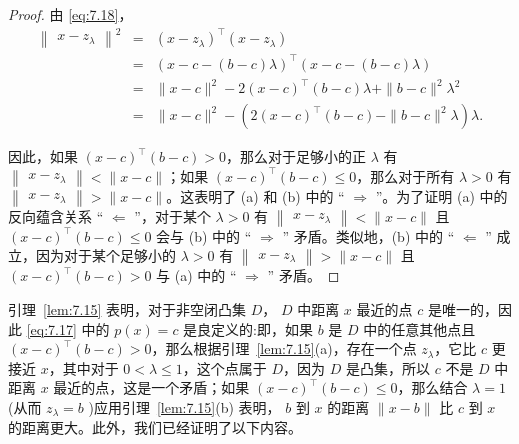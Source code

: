 \begin{proof}
由 \eqref{eq:7.18}，
\begin{eqnarray*}
{\begin{Vmatrix}x - {z}_{\lambda }\end{Vmatrix}}^{2} &=& {\left( x - {z}_{\lambda }\right) }^{\top }\left( {x - {z}_{\lambda }}\right)\\
&=& {\left( x - c - \left( b - c\right) \lambda \right) }^{\top }\left( {x - c - \left( {b - c}\right) \lambda }\right)\\
&=& \parallel x - c{\parallel }^{2} - 2{\left( x - c\right) }^{\top }\left( {b - c}\right) \lambda  + \parallel b - c{\parallel }^{2}{\lambda }^{2}
\\
&=& \parallel x - c{\parallel }^{2} - \left( {2{\left( x - c\right) }^{\top }\left( {b - c}\right)  - \parallel b - c{\parallel }^{2}\lambda }\right) \lambda .
\end{eqnarray*}

因此，如果 \({\left( x - c\right) }^{\top }\left( {b - c}\right)  > 0\)，那么对于足够小的正 \(\lambda\) 有 \(\begin{Vmatrix}{x - {z}_{\lambda }}\end{Vmatrix} < \parallel x - c\parallel\)；如果 \({\left( x - c\right) }^{\top }\left( {b - c}\right)  \leq  0\)，那么对于所有 \(\lambda  > 0\) 有 \(\begin{Vmatrix}{x - {z}_{\lambda }}\end{Vmatrix} > \parallel x - c\parallel\)。这表明了 (a) 和 (b) 中的 “ \(\Rightarrow\) ”。为了证明 (a) 中的反向蕴含关系 “ \(\Leftarrow\) ”，对于某个 \(\lambda  > 0\) 有 \(\begin{Vmatrix}{x - {z}_{\lambda }}\end{Vmatrix} < \parallel x - c\parallel\) 且 \({\left( x - c\right) }^{\top }\left( {b - c}\right)  \leq  0\) 会与 (b) 中的 “ \(\Rightarrow\) ” 矛盾。类似地，(b) 中的 “ \(\Leftarrow\) ” 成立，因为对于某个足够小的 \(\lambda  > 0\) 有 \(\begin{Vmatrix}{x - {z}_{\lambda }}\end{Vmatrix} > \parallel x - c\parallel\) 且 \({\left( x - c\right) }^{\top }\left( {b - c}\right)  > 0\) 与 (a) 中的 “ \(\Rightarrow\) ” 矛盾。
\end{proof}
\bigskip

引理~\ref{lem:7.15} 表明，对于非空闭凸集 \(D\)， \(D\) 中距离 \(x\) 最近的点 \(c\) 是唯一的，因此 \eqref{eq:7.17} 中的 \(p\left( x\right)  = c\) 是良定义的:即，如果 \(b\) 是 \(D\) 中的任意其他点且 \({\left( x - c\right) }^{\top }\left( {b - c}\right)  > 0\)，那么根据引理~\ref{lem:7.15}(a)，存在一个点 \({z}_{\lambda }\)，它比 \(c\) 更接近 \(x\)，其中对于 \(0 < \lambda  \leq  1\)，这个点属于 \(D\)，因为 \(D\) 是凸集，所以 \(c\) 不是 \(D\) 中距离 \(x\) 最近的点，这是一个矛盾；如果 \({\left( x - c\right) }^{\top }\left( {b - c}\right)  \leq  0\)，那么结合 \(\lambda  = 1\) (从而 \({z}_{\lambda } = b\) )应用引理~\ref{lem:7.15}(b) 表明， \(b\) 到 \(x\) 的距离 \(\parallel x - b\parallel\) 比 \(c\) 到 \(x\) 的距离更大。此外，我们已经证明了以下内容。


